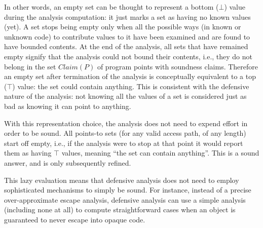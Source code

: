 In other words, an empty set can be thought to
represent a bottom ($\bot$) value during the analysis computation: it
just marks a set as having no known values (yet). A set stops being empty
only when all the possible ways (in known or unknown code) to contribute
values to it have been examined and are found to have bounded contents.
At the end of the analysis, all sets that have remained empty
signify that the analysis could not bound their contents, i.e., they
do not belong in the set \(Claim(P)\) of program points with
soundness claims. Therefore an empty set after termination of
the analysis is conceptually equivalent to a top ($\top$) value: the
set could contain anything. This is consistent with the defensive
nature of the analysis: not knowing all the values of a set is considered
just as bad as knowing it can point to anything.


With this representation choice, the analysis does not need to expend
effort in order to be sound. All points-to sets (for any valid access
path, of any length) start off empty, i.e., if the analysis were to
stop at that point it would report them as having $\top$ values,
meaning ``the set can contain anything''. This is a sound answer, and
is only subsequently refined.

This lazy evaluation means that defensive analysis does not need to
employ sophisticated mechanisms to simply be sound. For instance,
instead of a precise over-approximate escape
analysis,
defensive analysis can use a simple analysis
(including none at all) to compute straightforward cases when an
object is guaranteed to never escape into opaque code.


